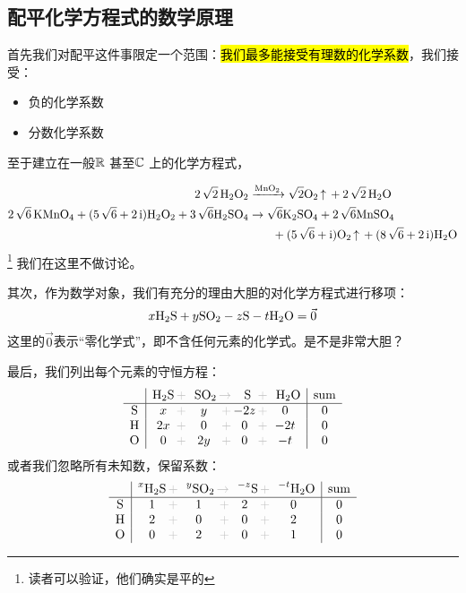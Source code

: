 \documentclass{ctexart}
\newcommand{\grayplus}{\,\color{lightgray}+\,}
\newcommand{\grayto}{\,\color{lightgray}\to\,}
\begin{document}
\subsection{配平化学方程式的数学原理}

首先我们对配平这件事限定一个范围：\hl{我们最多能接受有理数的化学系数}，我们接受：

\begin{itemize}
    \item \checkmark 负的化学系数
    \item \checkmark 分数化学系数
\end{itemize}
至于建立在一般\(\mathbb{R}\)
甚至\(\mathbb{C}\) 上的化学方程式，

\begin{align*}
    \ce{2\sqrt{2} H2O2 &->[MnO2] \sqrt{2}O2 ^ + 2\sqrt{2} H2O}\\
    \ce{2\sqrt{6} KMnO4 + (5\sqrt{6} + 2\i)H2O2 + 3\sqrt{6}H2SO4 &\to
        \sqrt{6}K2SO4 + 2\sqrt{6}MnSO4 \\
    & \qquad {} + (5\sqrt{6} + \i)O2 ^ + (8\sqrt{6} + 2\i)H2O}
\end{align*}\footnote{读者可以验证，他们确实是平的}
我们在这里不做讨论。

其次，作为数学对象，我们有充分的理由大胆的对化学方程式进行移项：
\[
    x \ce{H2S} + y \ce{SO2} - z \ce{S} - t \ce{H2O} = \vec{0}
\]
这里的\(\vec{0}\)表示“零化学式”，即不含任何元素的化学式。是不是非常大胆？

最后，我们列出每个元素的守恒方程：
\[
    \begin{array}{c|c@{\grayplus}c@{\grayplus}c@{\grayplus}c|c}
        & \multicolumn{1}{c@{\grayplus}}{\ce{H2S}} &
        \multicolumn{1}{c@{\grayto}}{\ce{SO2}} &
        \multicolumn{1}{c@{\grayplus}}{\ce{S}} &
        \multicolumn{1}{c|}{\ce{H2O}} & \text{sum} \\
        \hline
        \ce{S} & x & y & -2z & 0 & 0 \\
        \ce{H} & 2x & 0 & 0 & -2t & 0 \\
        \ce{O} & 0 & 2y & 0 & -t & 0 \\
    \end{array}
\]
或者我们忽略所有未知数，保留系数：
\[
    \begin{array}{c|c@{\grayplus}c@{\grayplus}c@{\grayplus}c|c}
        & \multicolumn{1}{c@{\grayplus}}{\prescript{x}{}{\ce{H2S}}} &
        \multicolumn{1}{c@{\grayto}}{\prescript{y}{}{\ce{SO2}}} &
        \multicolumn{1}{c@{\grayplus}}{\prescript{-z}{}{\ce{S}}} &
        \multicolumn{1}{c|}{\prescript{-t}{}{\ce{H2O}}} & \text{sum} \\
        \hline
        \ce{S} & 1 & 1 & 2 & 0 & 0 \\
        \ce{H} & 2 & 0 & 0 & 2 & 0 \\
        \ce{O} & 0 & 2 & 0 & 1 & 0 \\
    \end{array}
\]
\end{document}
